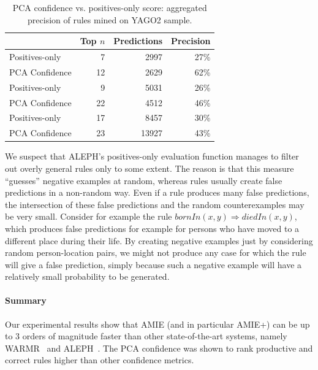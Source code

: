 \begin{table}
\begin{tabular}{l|rrr}
	    & Top $n$ & Predictions & Precision \\
 \hline
 Positives-only & 7 & 2997 & 27\% \\
 PCA Confidence & 12 & 2629 & 62\% \\
 \hline
 Positives-only & 9 & 5031 & 26\% \\
 PCA Confidence & 22 & 4512& 46\% \\
 \hline
 Positives-only & 17 & 8457 & 30\% \\
 PCA Confidence & 23 & 13927  & 43\% \\
\end{tabular}
\caption{PCA confidence vs. positives-only score: aggregated precision of rules mined on YAGO2 sample.}
\label{alephres}
\end{table}

We suspect that ALEPH's positives-only evaluation function manages to filter out overly general rules only to some extent.
The reason is that this measure ``guesses'' negative examples at random, whereas rules usually create false predictions in a non-random way.
Even if a rule produces many false predictions, the intersection of these false predictions and the random counterexamples may be very small.
Consider for example the rule $bornIn(x,y) \Rightarrow diedIn(x,y)$, which produces false predictions for example for persons who have moved
to a different place during their life.
By creating negative examples just by considering random person-location pairs,
we might not produce any case for which the rule will give a false prediction,
simply because such a negative example will have a relatively small probability to be generated.

\paragraph{Summary}
Our experimental results show that AMIE (and in particular AMIE+) can be up to 3 orders of magnitude faster
than other state-of-the-art systems, namely WARMR~\cite{GoeVan02} and ALEPH~\cite{Muggleton:1996:LPD:647996.742465}.
The PCA confidence was shown to rank productive and correct rules higher than other confidence metrics.


